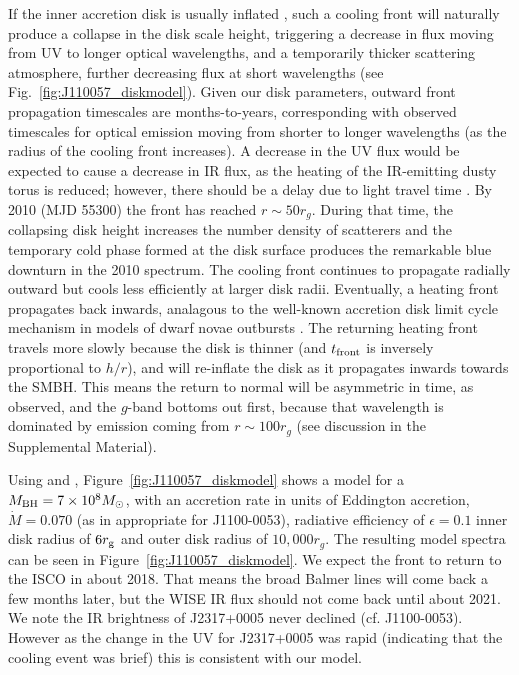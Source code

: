 \documentclass{nature}
\begin{document}
If the inner accretion disk is usually inflated \cite[see e.g.,
][]{Sirko_Goodman2003, Thompson2005, Hopkins_Quataert2011}, such a
cooling front will naturally produce a collapse in the disk scale
height, 
triggering a decrease in flux moving from UV to longer optical
wavelengths, and a temporarily thicker scattering atmosphere, further
decreasing flux at short wavelengths (see
Fig.~\ref{fig:J110057_diskmodel}). 
Given our disk parameters,
outward front propagation timescales are months-to-years,
corresponding with observed timescales for
optical emission moving from shorter to longer wavelengths (as the
radius of the cooling front increases). A
decrease in the UV flux would be expected to cause a decrease in IR
flux, as the heating of the IR-emitting dusty torus is reduced;
however, there should be a delay due to light travel time
\cite[e.g., ][]{Jun2015}.
By 2010 (MJD 55300) the front has reached $r\sim50
r_{g}$. During that time, the collapsing disk height increases the
number density of scatterers and the temporary cold phase formed
at the disk surface produces the remarkable blue downturn in the 2010
spectrum. The cooling front continues to propagate radially outward
but cools less efficiently at larger disk radii. Eventually, a heating
front propagates back inwards, analagous to the well-known accretion
disk limit cycle mechanism in models of dwarf novae outbursts
\cite[e.g., ][]{Cannizzo1998}. The returning heating front travels
more slowly because the disk is thinner (and $t_{\rm front}$ is
inversely proportional to $h/r$), and will re-inflate the disk as it
propagates inwards towards the SMBH. This means the return to normal
will be asymmetric in time, as observed, and the $g$-band bottoms out
first, because that wavelength is dominated by emission coming from
$r\sim100r_{g}$ (see discussion in the Supplemental Material).

Using \cite{Ford2018} and \cite{Sirko_Goodman2003},
Figure~\ref{fig:J110057_diskmodel} shows a model for a $M_{\rm
BH}=7\times 10^{8} M_{\odot}$, with an accretion rate in units of
Eddington accretion, $\dot{M}=0.070$ (as in appropriate for
J1100-0053), radiative efficiency of $\epsilon=0.1$ inner disk radius
of $6r_{\rm g}$ and outer disk radius of $10,000 r_{g}$. The resulting
model spectra can be seen in Figure~\ref{fig:J110057_diskmodel}.  We
expect the front to return to the ISCO in about 2018. That means the
broad Balmer lines will come back a few months later, but the WISE IR
flux should not come back until about 2021. We note the IR brightness of
J2317+0005 never declined (cf. J1100-0053). However as the change in
the UV for J2317+0005 was rapid (indicating that the cooling event
was brief) this is consistent with our model.
\end{document}
